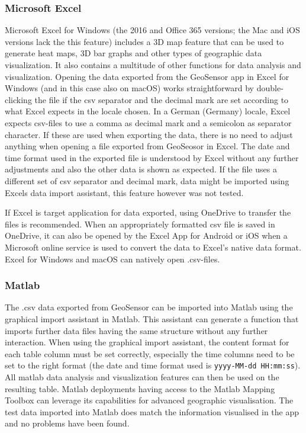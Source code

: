 \subsubsection{Microsoft Excel}
Microsoft Excel for Windows (the 2016 and Office 365 versions; the Mac and iOS versions lack the this feature) includes a 3D map feature that can be used to generate heat maps, 3D bar graphs and other types of geographic data visualization. It also contains a multitude of other functions for data analysis and visualization. Opening the data exported from the GeoSensor app in Excel for Windows (and in this case also on macOS) works straightforward by double-clicking the file if the csv separator and the decimal mark are set according to what Excel expects in the locale chosen. In a German (Germany) locale, Excel expects csv-files to use a comma as decimal mark and a semicolon as separator character. If these are used when exporting the data, there is no need to adjust anything when opening a file exported from GeoSeosor in Excel. The date and time format used in the exported file is understood by Excel without any further adjustments and also the other data is shown as expected. If the file uses a different set of csv separator and decimal mark, data might be imported using Excels data import assistant, this feature however was not tested.

If Excel is target application for data exported, using OneDrive to transfer the files is recommended. When an appropriately formatted csv file is saved in OneDrive, it can also be opened by the Excel App for Android or iOS when a Microsoft online service is used to convert the data to Excel's native data format. Excel for Windows and macOS can natively open .csv-files.

\subsubsection{Matlab}
The .csv data exported from GeoSensor can be imported into Matlab using the graphical import assistant in Matlab. This assistant can generate a function that imports further data files having the same structure without any further interaction. When using the graphical import assistant, the content format for each table column must be set correctly, especially the time columns need to be set to the right format (the date and time format used is \texttt{yyyy-MM-dd HH:mm:ss}). All matlab data analysis and visualization features can then be used on the resulting table. Matlab deployments having access to the Matlab Mapping Toolbox can leverage its capabilities for advanced geographic visualisation. The test data imported into Matlab does match the information visualised in the app and no problems have been found.

